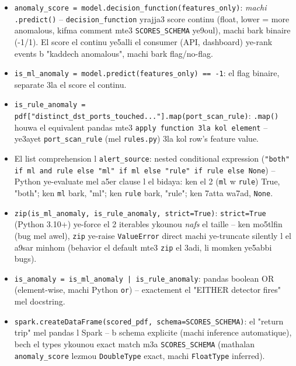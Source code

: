 \documentclass[11pt,a4paper]{report}
\DeclareRobustCommand{\code}[1]{\texttt{#1}}
\begin{document}
\begin{itemize}
  \item \code{anomaly\_score = model.decision\_function(features\_only)}:
        \emph{machi} \code{.predict()} -- \code{decision\_function}
        yrajja3 score continu (float, lower = more anomalous, kifma
        comment mte3 \code{SCORES\_SCHEMA} ye9oul), machi bark
        binaire (-1/1). El score el continu ye5alli el consumer (API,
        dashboard) ye-rank events b "kaddech anomalous", machi bark
        flag/no-flag.
  \item \code{is\_ml\_anomaly = model.predict(features\_only) == -1}:
        el flag binaire, separate 3la el score el continu.
  \item \code{is\_rule\_anomaly = pdf["distinct\_dst\_ports\_touched..."].map(port\_scan\_rule)}:
        \code{.map()} houwa el equivalent pandas mte3 \code{apply function
        3la kol element} -- ye3ayet \code{port\_scan\_rule} (mel
        \code{rules.py}) 3la kol row's feature value.
  \item El list comprehension l \code{alert\_source}: nested conditional
        expression (\code{"both" if ml and rule else "ml" if ml else
        "rule" if rule else None}) -- Python ye-evaluate mel a5er
        clause l el bidaya: ken el 2 (\code{ml} w \code{rule}) True,
        "both"; ken \code{ml} bark, "ml"; ken \code{rule} bark, "rule";
        ken 7atta wa7ad, \code{None}.
  \item \code{zip(is\_ml\_anomaly, is\_rule\_anomaly, strict=True)}:
        \code{strict=True} (Python 3.10+) ye-force el 2 iterables ykounou
        \emph{nafs} el taille -- ken mo5tlfin (bug mel awel), \code{zip}
        ye-raise \code{ValueError} direct machi ye-truncate silently
        l el a9sar minhom (behavior el default mte3 \code{zip} el 3adi,
        li momken ye5abbi bugs).
  \item \code{is\_anomaly = is\_ml\_anomaly | is\_rule\_anomaly}: pandas
        boolean OR (element-wise, machi Python \code{or}) -- exactement
        el "EITHER detector fires" mel docstring.
  \item \code{spark.createDataFrame(scored\_pdf, schema=SCORES\_SCHEMA)}:
        el "return trip" mel pandas l Spark -- b schema explicite (machi
        inference automatique), bech el types ykounou exact match m3a
        \code{SCORES\_SCHEMA} (mathalan \code{anomaly\_score} lezmou
        \code{DoubleType} exact, machi \code{FloatType} inferred).
\end{itemize}
\end{document}
